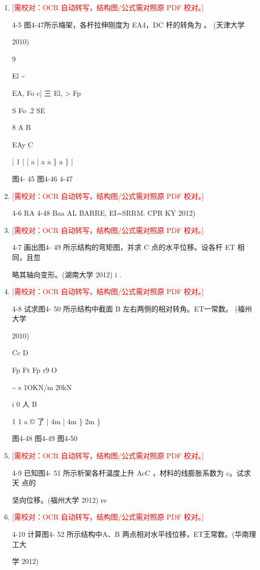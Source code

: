 \documentclass[UTF8,12pt,a4paper,openany]{ctexbook}
\newcommand{\TODO}[1]{\textcolor{red}{[需校对：#1]}}
\begin{document}
\begin{enumerate}[label=\textbf{\arabic*.},leftmargin=2em]
\item \TODO{OCR 自动转写，结构图/公式需对照原 PDF 校对。}\par 4-5 图4-47所示梅架，各杆拉伸刚度为 EA4，DC 杆的转角为 。 (天津大学\par 2010)\par 9\par El       \textasciitilde{}\par EA,   Fo      c| 三         El,  >                      Fp\par S                                 Fo .2      SE\par 8                                          A                B\par EAy                      C\par |      1    |     |  a  |  a    a \}  a  \} |\par 图4- 45              图4-46           4-47
\item \TODO{OCR 自动转写，结构图/公式需对照原 PDF 校对。}\par 4-6 RA 4-48 Baa AL BARRE, EI=SRRM. CPR KY 2012)
\item \TODO{OCR 自动转写，结构图/公式需对照原 PDF 校对。}\par 4-7 画出图4- 49 所示结构的弯矩图，并求 C 点的水平位移。设各杆 ET 相同，且忽\par 略其轴向变形。(湖南大学 2012)  i   .
\item \TODO{OCR 自动转写，结构图/公式需对照原 PDF 校对。}\par 4-8 试求图4- 50 所示结构中截面 B 左右两侧的相对转角。ET一常数。 (福州大学\par 2010)\par Cc     D\par Fp Ft Fp                  r9     O\par \textasciitilde{}                        s         1OKN/m      20kN\par i     0                人       B\par 1       1              a ©         了        |  4m  |  4m  \} 2m \}\par 图4-48                  图4-49                 图4-50
\item \TODO{OCR 自动转写，结构图/公式需对照原 PDF 校对。}\par 4-9 已知图4- 51 所示析架各杆温度上升 AcC ，材料的线膨胀系数为 c。试求 天 点的\par 坚向位移。(福州大学 2012)                               re
\item \TODO{OCR 自动转写，结构图/公式需对照原 PDF 校对。}\par 4-10 计算图4- 52 所示结构中A、B 两点相对水平线位移，ET王常数。(华南理工大\par 学 2012)

\end{enumerate}
\end{document}

